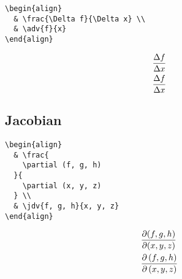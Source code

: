 \documentclass[../../latex]{subfiles}
\begin{document}
\begin{minipage}{0.47 \textwidth}
  \begin{verbatim}
\begin{align}
  & \frac{\Delta f}{\Delta x} \\
  & \adv{f}{x}
\end{align}
  \end{verbatim}
\end{minipage}
\hfill
\begin{minipage}{0.47 \textwidth}
  \begin{align}
     & \frac{\Delta f}{\Delta x} \\
     & \adv{f}{x}
  \end{align}
\end{minipage}

\subsection{Jacobian}

\begin{minipage}{0.47 \textwidth}
  \begin{verbatim}
\begin{align}
  & \frac{
    \partial (f, g, h)
  }{
    \partial (x, y, z)
  } \\
  & \jdv{f, g, h}{x, y, z}
\end{align}
  \end{verbatim}
\end{minipage}
\hfill
\begin{minipage}{0.47 \textwidth}
  \begin{align}
     & \frac{
      \partial (f, g, h)
    }{
      \partial (x, y, z)
    }                         \\
     & \jdv{f, g, h}{x, y, z}
  \end{align}
\end{minipage}
\end{document}
